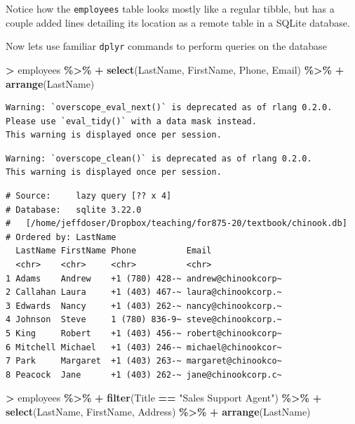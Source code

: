 \documentclass[
]{krantz}
\makeatletter
\newenvironment{Shaded}{\begin{snugshade}}{\end{snugshade}}
\newcommand{\KeywordTok}[1]{\textcolor[rgb]{0.27,0.27,0.27}{\textbf{#1}}}
\newcommand{\NormalTok}[1]{#1}
\newcommand{\OperatorTok}[1]{\textcolor[rgb]{0.43,0.43,0.43}{\textbf{#1}}}
\newcommand{\StringTok}[1]{\textcolor[rgb]{0.5,0.5,0.5}{#1}}
\newenvironment{kframe}{%
\medskip{}
\setlength{\fboxsep}{.8em}
 \def\at@end@of@kframe{}%
 \ifinner\ifhmode%
  \def\at@end@of@kframe{\end{minipage}}%
  \begin{minipage}{\columnwidth}%
 \fi\fi%
 \def\FrameCommand##1{\hskip\@totalleftmargin \hskip-\fboxsep
 \colorbox{shadecolor}{##1}\hskip-\fboxsep
     \hskip-\linewidth \hskip-\@totalleftmargin \hskip\columnwidth}%
 \MakeFramed {\advance\hsize-\width
   \@totalleftmargin\z@ \linewidth\hsize
   \@setminipage}}%
 {\par\unskip\endMakeFramed%
 \at@end@of@kframe}
\renewenvironment{Shaded}{\begin{kframe}}{\end{kframe}}
\makeatother
\begin{document}
Notice how the \texttt{employees} table looks mostly like a regular tibble, but has a couple added lines detailing its location as a remote table in a SQLite database.

Now lets use familiar \texttt{dplyr} commands to perform queries on the database

\begin{Shaded}
\begin{Highlighting}[]
\OperatorTok{\textgreater{}}\StringTok{ }\NormalTok{employees }\OperatorTok{\%\textgreater{}\%}\StringTok{ }
\OperatorTok{+}\StringTok{   }\KeywordTok{select}\NormalTok{(LastName, FirstName, Phone, Email) }\OperatorTok{\%\textgreater{}\%}\StringTok{ }
\OperatorTok{+}\StringTok{   }\KeywordTok{arrange}\NormalTok{(LastName)}
\end{Highlighting}
\end{Shaded}

\begin{verbatim}
Warning: `overscope_eval_next()` is deprecated as of rlang 0.2.0.
Please use `eval_tidy()` with a data mask instead.
This warning is displayed once per session.
\end{verbatim}

\begin{verbatim}
Warning: `overscope_clean()` is deprecated as of rlang 0.2.0.
This warning is displayed once per session.
\end{verbatim}

\begin{verbatim}
# Source:     lazy query [?? x 4]
# Database:   sqlite 3.22.0
#   [/home/jeffdoser/Dropbox/teaching/for875-20/textbook/chinook.db]
# Ordered by: LastName
  LastName FirstName Phone          Email              
  <chr>    <chr>     <chr>          <chr>              
1 Adams    Andrew    +1 (780) 428-~ andrew@chinookcorp~
2 Callahan Laura     +1 (403) 467-~ laura@chinookcorp.~
3 Edwards  Nancy     +1 (403) 262-~ nancy@chinookcorp.~
4 Johnson  Steve     1 (780) 836-9~ steve@chinookcorp.~
5 King     Robert    +1 (403) 456-~ robert@chinookcorp~
6 Mitchell Michael   +1 (403) 246-~ michael@chinookcor~
7 Park     Margaret  +1 (403) 263-~ margaret@chinookco~
8 Peacock  Jane      +1 (403) 262-~ jane@chinookcorp.c~
\end{verbatim}

\begin{Shaded}
\begin{Highlighting}[]
\OperatorTok{\textgreater{}}\StringTok{ }\NormalTok{employees }\OperatorTok{\%\textgreater{}\%}\StringTok{ }
\OperatorTok{+}\StringTok{   }\KeywordTok{filter}\NormalTok{(Title }\OperatorTok{==}\StringTok{ "Sales Support Agent"}\NormalTok{) }\OperatorTok{\%\textgreater{}\%}\StringTok{ }
\OperatorTok{+}\StringTok{   }\KeywordTok{select}\NormalTok{(LastName, FirstName, Address) }\OperatorTok{\%\textgreater{}\%}\StringTok{ }
\OperatorTok{+}\StringTok{   }\KeywordTok{arrange}\NormalTok{(LastName)}
\end{Highlighting}
\end{Shaded}
\end{document}
